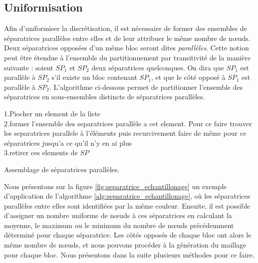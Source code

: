 \subsection{Uniformisation}

Afin d'uniformiser la discrétisation, il est nécessaire de former des ensembles de séparatrices parallèles entre elles et de leur attribuer le même nombre de nœuds. Deux séparatrices opposées d'un même bloc seront dites \emph{parallèles}. Cette notion peut être étendue à l'ensemble du partitionnement par transitivité de la manière suivante : soient $SP_1$ et $SP_2$ deux séparatrices quelconques. On dira que $SP_1$ est parallèle à $SP_2$ s'il existe un bloc contenant $SP_1$, et que le côté opposé à $SP_1$ est parallèle à $SP_2$. L'algorithme ci-dessous permet de partitionner l'ensemble des séparatrices en sous-ensembles distincts de séparatrices parallèles.

\vspace{0.5cm}
\begin{algorithm}[H]
\label{alg:separatrice_echantillonage}
\renewcommand{\algorithmcfname}{Algorithme}%
\SetAlgoLined
{}
\vspace{0.2cm}
{
\vspace{0.2cm}
1.\quad Piocher un element de la liste\\[0.2cm]
2.\quad former l'ensemble des separatrices parallèle a cet element. Pour ce faire trouver les separatrices parallele à l'éléments puis recurcivement faire de même pour ce séparatrices jusqu'a ce qu'il n'y en ai plus\\[0.2cm]
3.\quad retirer ces elements de $SP$\\[0.2cm]
}
\vspace{0.2cm}
\caption{Assemblage de séparatrices parallèles.}
\end{algorithm}
\vspace{0.5cm}

Nous présentons sur la figure \ref{fig:separatrice_echantillonage} un exemple d'application de l'algorithme \ref{alg:separatrice_echantillonage}, où les séparatrices parallèles entre elles sont identifiées par la même couleur. Ensuite, il est possible d'assigner un nombre uniforme de nœuds à ces séparatrices en calculant la moyenne, le maximum ou le minimum du nombre de nœuds précédemment déterminé pour chaque séparatrice. Les côtés opposés de chaque bloc ont alors le même nombre de nœuds, et nous pouvons procéder à la génération du maillage pour chaque bloc. Nous présentons dans la suite plusieurs méthodes pour ce faire.

